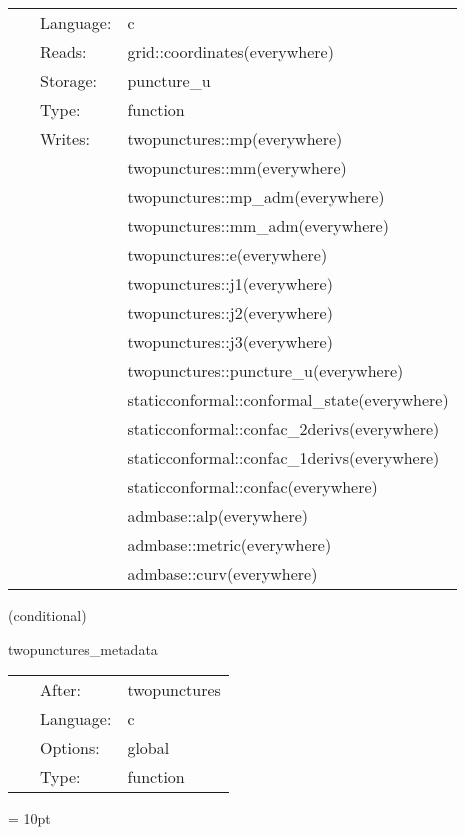  \begin{tabular*}{160mm}{cll} 
~ & Language:  & c \\ 
~ & Reads:  & grid::coordinates(everywhere) \\ 
~ & Storage:  & puncture\_u \\ 
~ & Type:  & function \\ 
~ & Writes:  & twopunctures::mp(everywhere) \\ 
~& ~ &twopunctures::mm(everywhere)\\ 
~& ~ &twopunctures::mp\_adm(everywhere)\\ 
~& ~ &twopunctures::mm\_adm(everywhere)\\ 
~& ~ &twopunctures::e(everywhere)\\ 
~& ~ &twopunctures::j1(everywhere)\\ 
~& ~ &twopunctures::j2(everywhere)\\ 
~& ~ &twopunctures::j3(everywhere)\\ 
~& ~ &twopunctures::puncture\_u(everywhere)\\ 
~& ~ &staticconformal::conformal\_state(everywhere)\\ 
~& ~ &staticconformal::confac\_2derivs(everywhere)\\ 
~& ~ &staticconformal::confac\_1derivs(everywhere)\\ 
~& ~ &staticconformal::confac(everywhere)\\ 
~& ~ &admbase::alp(everywhere)\\ 
~& ~ &admbase::metric(everywhere)\\ 
~& ~ &admbase::curv(everywhere)\\ 
\end{tabular*} 


\vspace{5mm}

   (conditional) 

\hspace{5mm} twopunctures\_metadata 

\hspace{5mm}{\it output twopunctures metadata } 


\hspace{5mm}

 \begin{tabular*}{160mm}{cll} 
~ & After:  & twopunctures \\ 
~ & Language:  & c \\ 
~ & Options:  & global \\ 
~ & Type:  & function \\ 
\end{tabular*} 



\vspace{5mm}\parskip = 10pt 

